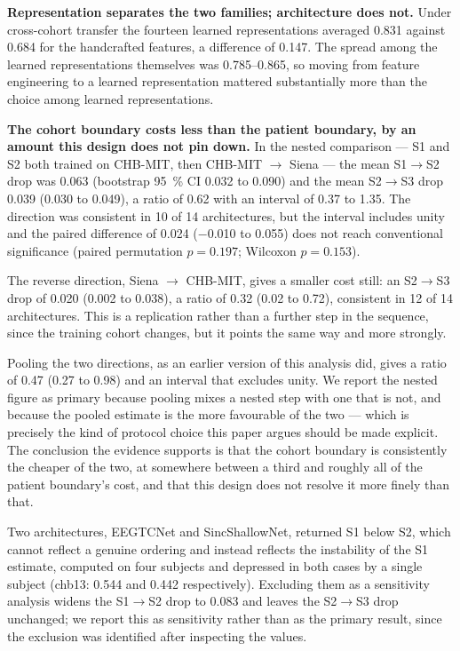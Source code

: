 \documentclass[11pt,a4paper]{article}
\begin{document}
\textbf{Representation separates the two families; architecture does not.}
Under cross-cohort transfer the fourteen learned representations averaged
0.831 against 0.684 for the handcrafted features, a difference of 0.147. The
spread among the learned representations themselves was 0.785--0.865, so
moving from feature engineering to a learned representation mattered
substantially more than the choice among learned representations.

\textbf{The cohort boundary costs less than the patient boundary, by an
amount this design does not pin down.} In the nested comparison --- S1 and
S2 both trained on CHB-MIT, then CHB-MIT $\rightarrow$ Siena --- the mean
S1$\to$S2 drop was 0.063 (bootstrap \SI{95}{\percent} CI 0.032 to 0.090) and
the mean S2$\to$S3 drop 0.039 (0.030 to 0.049), a ratio of 0.62 with an
interval of 0.37 to 1.35. The direction was consistent in 10 of 14
architectures, but the interval includes unity and the paired difference of
0.024 ($-$0.010 to 0.055) does not reach conventional significance (paired
permutation $p=0.197$; Wilcoxon $p=0.153$).

The reverse direction, Siena $\rightarrow$ CHB-MIT, gives a smaller cost
still: an S2$\to$S3 drop of 0.020 (0.002 to 0.038), a ratio of 0.32 (0.02 to
0.72), consistent in 12 of 14 architectures. This is a replication rather
than a further step in the sequence, since the training cohort changes, but
it points the same way and more strongly.

Pooling the two directions, as an earlier version of this analysis did,
gives a ratio of 0.47 (0.27 to 0.98) and an interval that excludes unity.
We report the nested figure as primary because pooling mixes a nested step
with one that is not, and because the pooled estimate is the more favourable
of the two --- which is precisely the kind of protocol choice this paper
argues should be made explicit. The conclusion the evidence supports is that
the cohort boundary is consistently the cheaper of the two, at somewhere
between a third and roughly all of the patient boundary's cost, and that
this design does not resolve it more finely than that.

Two architectures, EEGTCNet and SincShallowNet, returned S1 below S2, which
cannot reflect a genuine ordering and instead reflects the instability of
the S1 estimate, computed on four subjects and depressed in both cases by a
single subject (chb13: 0.544 and 0.442 respectively). Excluding them as a
sensitivity analysis widens the S1$\to$S2 drop to 0.083 and leaves the
S2$\to$S3 drop unchanged; we report this as sensitivity rather than as the
primary result, since the exclusion was identified after inspecting the
values.
\end{document}
